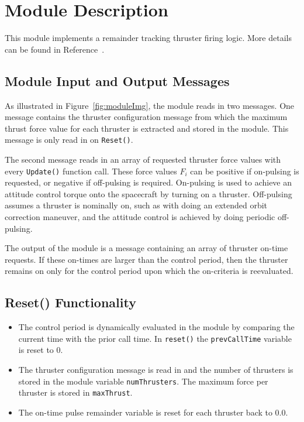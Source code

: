 


\section{Module Description}
This module implements a remainder tracking thruster firing logic.  More details can be found in Reference~.  

\subsection{Module Input and Output Messages}
As illustrated in Figure~\ref{fig:moduleImg}, the module reads in two messages.  One message contains the thruster configuration message from which the maximum thrust force value for each thruster is extracted and stored in the module.  This message is only read in on {\tt Reset()}.  

The second message reads in an array of requested thruster force values with every {\tt Update()} function call.  These force values $F_{i}$ can be positive if on-pulsing is requested, or negative if off-pulsing is required.  On-pulsing is used to achieve an attitude control torque onto the spacecraft by turning on a thruster.  Off-pulsing assumes a thruster is nominally on, such as with doing an extended orbit correction maneuver, and the attitude control is achieved by doing periodic off-pulsing.  

The output of the module is a message containing an array of thruster on-time requests.  If these on-times are larger than the control period, then the thruster remains on only for the control period upon which the on-criteria is reevaluated.  


\subsection{Reset() Functionality}
\begin{itemize}
	\item The control period is dynamically evaluated in the module by comparing the current time with the prior call time.  In {\tt reset()} the {\tt prevCallTime} variable is reset to 0.  
	\item The thruster configuration message is read in and the number of thrusters is stored in the module variable {\tt numThrusters}.  The maximum force per thruster is stored in {\tt maxThrust}.
	\item The on-time pulse remainder variable is reset for each thruster back to 0.0.
\end{itemize}

